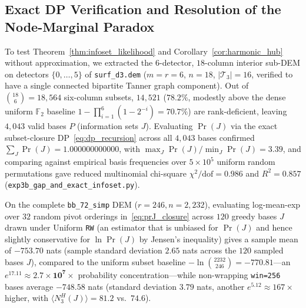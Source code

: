 \documentclass[12pt]{article}
\theoremstyle{definition}
\newcommand{\Ftwo}{\mathbb{F}_2}
\newcommand{\Tc}{\mathcal{T}_3}
\newcommand{\ttt}[1]{\texttt{#1}}
\begin{document}
\subsection{Exact DP Verification and Resolution of the Node-Marginal Paradox}\label{subsec:paradox}

To test Theorem~\ref{thm:infoset_likelihood} and Corollary~\ref{cor:harmonic_hub} without approximation, we
extracted the $6$-detector, $18$-column interior sub-DEM on detectors $\{0, \dots, 5\}$ of \ttt{surf\_d3.dem} ($m =
r = 6$, $n = 18$, $|\Tc| = 16$, verified to have a single connected bipartite Tanner graph component). Out of
$\binom{18}{6} = 18{,}564$ six-column subsets, $14{,}521$ ($78.2\%$, modestly above the dense uniform $\Ftwo$
baseline $1 - \prod_{i=1}^6 (1 - 2^{-i}) = 70.7\%$) are rank-deficient, leaving $4{,}043$ valid bases $P$
(information sets $J$). Evaluating $\Pr(J)$ via the exact subset-closure DP~\eqref{eq:dp_recursion} across all
$4{,}043$ bases confirmed $\sum_{J} \Pr(J) = 1.000000000000$, with $\max_J \Pr(J) / \min_J \Pr(J) = 3.39$, and
comparing against empirical basis frequencies over $5 \times 10^5$ uniform random permutations gave reduced
multinomial chi-square $\chi^2 / \mathrm{dof} = 0.986$ and $R^2 = 0.857$
(\ttt{exp3b\_gap\_and\_exact\_infoset.py}).

On the complete \ttt{bb\_72\_simp} DEM ($r = 246, n = 2{,}232$), evaluating log-mean-exp over $32$ random pivot
orderings in~\eqref{eq:prJ_closure} across $120$ greedy bases $J$ drawn under Uniform \ttt{RW} (an estimator that is
unbiased for $\Pr(J)$ and hence slightly conservative for $\ln \Pr(J)$ by Jensen's inequality) gives a sample mean
of $-753.70$ nats (sample standard deviation $2.65$ nats across the $120$ sampled bases $J$), compared to the
uniform subset baseline $-\ln\binom{2232}{246} = -770.81$---an $e^{17.11} \approx \mathbf{2.7 \times 10^7\times}$
probability concentration---while non-wrapping \ttt{win=256} bases average $-748.58$ nats (standard deviation $3.79$
nats, another $e^{5.12} \approx 167\times$ higher, with $\langle N_3^H(J) \rangle = 81.2$ vs.\ $74.6$).
\end{document}
